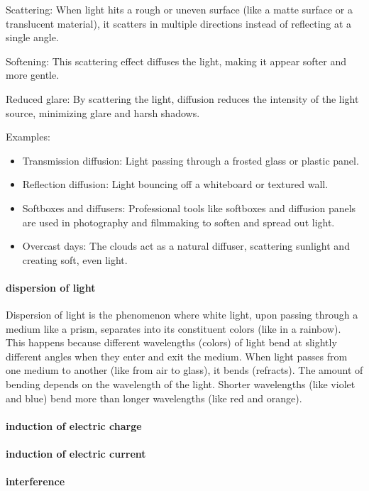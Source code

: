 \documentclass[a4paper]{article}
\theoremstyle{plain}
\theoremstyle{definition}
\begin{document}
Scattering: When light hits a rough or uneven surface (like a matte
surface or a translucent material), it scatters in multiple directions
instead of reflecting at a single angle.

Softening: This scattering effect diffuses the light, making it appear
softer and more gentle.

Reduced glare: By scattering the light, diffusion reduces the
intensity of the light source, minimizing glare and harsh shadows.

Examples:
\begin{itemize}
\item Transmission diffusion: Light passing through a frosted glass or
  plastic panel.
\item Reflection diffusion: Light bouncing off a whiteboard or
  textured wall.
\item Softboxes and diffusers: Professional tools like softboxes and
  diffusion panels are used in photography and filmmaking to soften
  and spread out light.
\item Overcast days: The clouds act as a natural diffuser, scattering
  sunlight and creating soft, even light.
\end{itemize}

\paragraph{dispersion of light}

Dispersion of light is the phenomenon where white light, upon passing
through a medium like a prism, separates into its constituent colors
(like in a rainbow).  This happens because different wavelengths
(colors) of light bend at slightly different angles when they enter
and exit the medium.  When light passes from one medium to another
(like from air to glass), it bends (refracts).  The amount of bending
depends on the wavelength of the light.  Shorter wavelengths (like
violet and blue) bend more than longer wavelengths (like red and
orange).

\paragraph{induction of electric charge}

\paragraph{induction of electric current}

\paragraph{interference}
\end{document}
